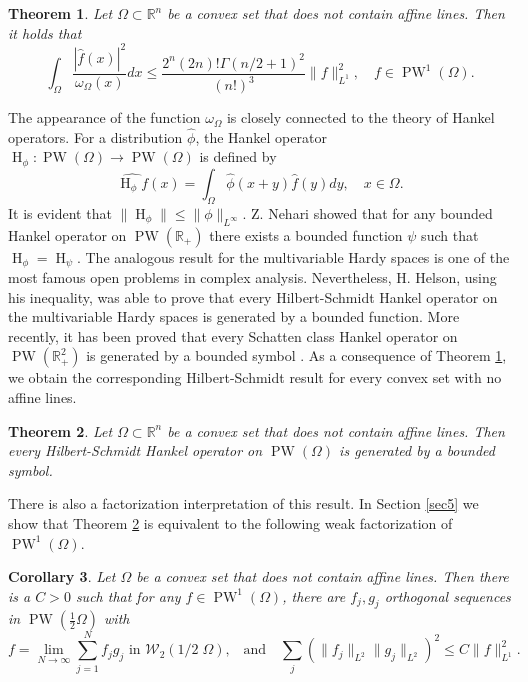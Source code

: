 \documentclass{amsart}
\theoremstyle{plain}
\newtheorem{theo}{Theorem}[section]
\newtheorem{cor}[theo]{Corollary}
\DeclareMathOperator{\Ha}{H}
\DeclareMathOperator{\PW}{PW}
\begin{document}
\begin{theo}\label{helson}
	Let $\Omega\subset \mathbb{R}^n$ be a convex set that does not contain affine lines. Then it holds that
	$$\int_{\Omega}\dfrac{|\hat{f}(x)|^2}{\omega_\Omega(x)}dx\leq \frac{2^n(2n)!\Gamma(n/2+1)^2}{(n!)^3}\|f\|_{L^1}^2, \quad f\in\PW^1(\Omega).$$
\end{theo}

The appearance of the function $\omega_\Omega$ is closely connected to the theory of Hankel operators. For a distribution $\widehat{\phi}$, the Hankel operator $\Ha_\phi:\PW(\Omega)\to \PW(\Omega)$ is defined by
$$\widehat{\Ha_\phi f}(x)=\int_\Omega \widehat{\phi}(x+y)\hat{f}(y)dy, \quad x\in \Omega.$$
It is evident that $\|\Ha_\phi\|\leq \|\phi\|_{L^\infty}$. Z. Nehari \cite{nehari1957bounded} showed that for any bounded Hankel operator on $\PW(\mathbb{R}_+)$ there exists a bounded function $\psi$ such that $\Ha_\phi=\Ha_\psi$. The analogous result for the multivariable Hardy spaces is one of the most famous open problems in complex analysis. Nevertheless, H. Helson, using his inequality, was able to prove that every Hilbert-Schmidt Hankel operator on the multivariable Hardy spaces is generated by a bounded function. More recently, it has been proved that every Schatten class Hankel operator on $\PW(\mathbb{R}^2_+)$ is generated by a bounded symbol \cite{bampouras2026recoveringproductbmoschatten}. As a consequence of Theorem \ref{helson}, we obtain the corresponding Hilbert-Schmidt result for every convex set with no affine lines.

\begin{theo}\label{theo1.2}
	Let $\Omega\subset\mathbb{R}^n$ be a convex set that does not contain affine lines. Then every Hilbert-Schmidt Hankel operator on $\PW(\Omega)$ is generated by a bounded symbol.
\end{theo}

There is also a factorization interpretation of this result. In Section \ref{sec5} we show that Theorem \ref{theo1.2} is equivalent to the following weak factorization of $\PW^1(\Omega)$.

\begin{cor}
	Let $\Omega$ be a convex set that does not contain affine lines. Then there is a $C>0$ such that for any $f\in \PW^1(\Omega)$, there are $f_j,g_j$ orthogonal sequences in $\PW(\frac{1}{2}\Omega)$ with
	$$f=\lim_{N\to \infty} \sum_{j=1}^N f_j g_j \text{ in $\mathcal{W}_2(1/2 \; \Omega)$,} \quad  \text{and}\quad  \sum_j (\|f_j\|_{L^2}\|g_j\|_{L^2})^2\leq C\|f\|_{L^1}^2.$$
\end{cor}
\end{document}
